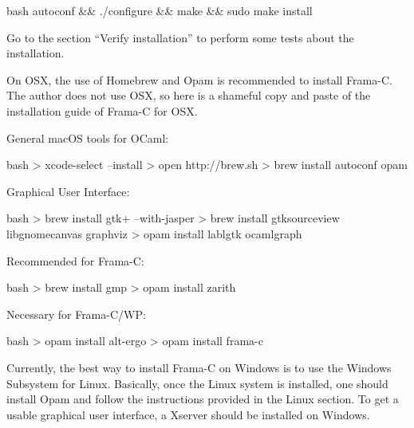 \begin{CodeBlock}{bash}
autoconf && ./configure && make && sudo make install
\end{CodeBlock}



Go to the section ``Verify installation'' to perform some tests about
the installation.





On OSX, the use of Homebrew and Opam is recommended to install Frama-C.
The author does not use OSX, so here is a shameful copy and paste of the
installation guide of Frama-C for OSX.




General macOS tools for OCaml:



\begin{CodeBlock}{bash}
> xcode-select --install
> open http://brew.sh
> brew install autoconf opam
\end{CodeBlock}



Graphical User Interface:



\begin{CodeBlock}{bash}
> brew install gtk+ --with-jasper
> brew install gtksourceview libgnomecanvas graphviz
> opam install lablgtk ocamlgraph
\end{CodeBlock}



Recommended for Frama-C:



\begin{CodeBlock}{bash}
> brew install gmp
> opam install zarith
\end{CodeBlock}



Necessary for Frama-C/WP:



\begin{CodeBlock}{bash}
> opam install alt-ergo
> opam install frama-c
\end{CodeBlock}





Currently, the best way to install Frama-C on Windows is to use the
Windows Subsystem for Linux. Basically, once the Linux system is installed,
one should install Opam and follow the instructions provided in the Linux
section. To get a usable graphical user interface, a Xserver should be
installed on Windows.


